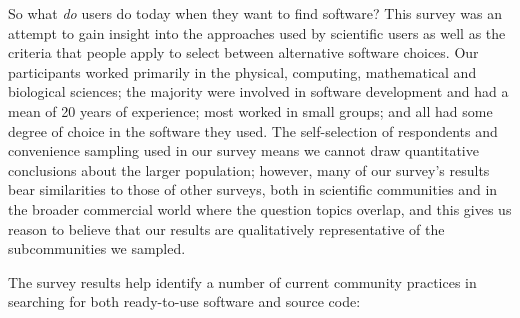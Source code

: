 \documentclass{casicswhitepaper}
\begin{document}
%
%

So what \emph{do} users do today when they want to find software?  This survey was an attempt to gain insight into the approaches used by scientific users as well as the criteria that people apply to select between alternative software choices.  Our participants worked primarily in the physical, computing, mathematical and biological sciences; the majority were involved in software development and had a mean of 20 years of experience; most worked in small groups; and all had some degree of choice in the software they used.  The self-selection of respondents and convenience sampling used in our survey means we cannot draw quantitative conclusions about the larger population; however, many of our survey's results bear similarities to those of other surveys, both in scientific communities and in the broader commercial world where the question topics overlap, and this gives us reason to believe that our results are qualitatively representative of the subcommunities we sampled.

The survey results help identify a number of current community practices in searching for both ready-to-use software and source code:
\end{document}
